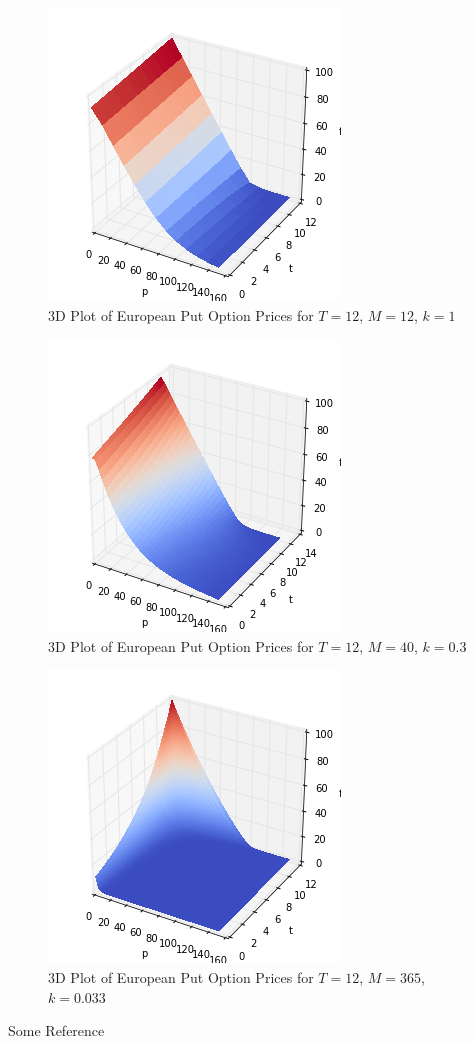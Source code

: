 \documentclass[paper=a4, fontsize=10pt]{article} %
\begin{document}
\begin{figure}[h!]
\center
\includegraphics[scale=0.8]{3d_k_12_12.png}
\caption{3D Plot of European Put Option Prices for $T=12$, $M=12$, $k=1$}
\end{figure}

\begin{figure}[h!]
\center
\includegraphics[scale=0.8]{3d_k_12_40.png}
\caption{3D Plot of European Put Option Prices for $T=12$, $M=40$, $k=0.3$}
\end{figure}

\begin{figure}[h!]
\center
\includegraphics[scale=0.8]{3d_k_12_365.png}
\caption{3D Plot of European Put Option Prices for $T=12$, $M=365$, $k=0.033$}
\end{figure}

\clearpage
\begin{thebibliography}{9}
Some Reference
 
\end{thebibliography}
\end{document}
